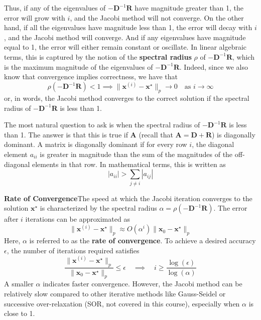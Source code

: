 Thus, if any of the eigenvalues of $-\mathbf{D}^{-1}\mathbf{R}$ have magnitude greater than 1, the error will grow with $i$, and the Jacobi method will not converge. On the other hand, if all the eigenvalues have magnitude less than 1, the error will decay with $i$, and the Jacobi method will converge. And if any eigenvalues have magnitude equal to 1, the error will either remain constant or oscillate. In linear algebraic terms, this is captured by the notion of the \textbf{spectral radius} $\rho$ of $-\mathbf{D}^{-1}\mathbf{R}$, which is the maximum magnitude of the eigenvalues of $-\mathbf{D}^{-1}\mathbf{R}$. Indeed, since we also know that convergence implies correctness, we have that
\begin{equation*}
    \rho(-\mathbf{D}^{-1}\mathbf{R}) < 1 \implies \|\mathbf{x}^{(i)} - \mathbf{x}^\star\|_p \to 0 \quad \text{as } i \to \infty
\end{equation*}
or, in words, the Jacobi method converges to the correct solution if the spectral radius of $-\mathbf{D}^{-1}\mathbf{R}$ is less than 1.

The most natural question to ask is when the spectral radius of $-\mathbf{D}^{-1}\mathbf{R}$ is less than 1. The answer is that this is true if $\mathbf{A}$ (recall that $\mathbf{A} = \mathbf{D} + \mathbf{R}$) is diagonally dominant. A matrix is diagonally dominant if for every row $i$, the diagonal element $a_{ii}$ is greater in magnitude than the sum of the magnitudes of the off-diagonal elements in that row. In mathematical terms, this is written as
\begin{equation*}
    |a_{ii}| > \sum_{j \neq i} |a_{ij}|
\end{equation*}

\textbf{Rate of Convergence}\quad The speed at which the Jacobi iteration converges to the solution $\mathbf{x}^\star$ is characterized by the spectral radius $\alpha = \rho(-\mathbf{D}^{-1}\mathbf{R})$. The error after $i$ iterations can be approximated as
\begin{equation*}
    \|\mathbf{x}^{(i)} - \mathbf{x}^\star\|_p \approx O(\alpha^i) \|\mathbf{x}_0 - \mathbf{x}^\star\|_p
\end{equation*}
Here, $\alpha$ is referred to as the \textbf{rate of convergence}. To achieve a desired accuracy $\epsilon$, the number of iterations required satisfies
\begin{equation*}
    \frac{\|\mathbf{x}^{(i)} - \mathbf{x}^\star\|_p}{\|\mathbf{x}_0 - \mathbf{x}^\star\|_p} \leq \epsilon 
    \quad\implies\quad 
    i \geq \frac{\log(\epsilon)}{\log(\alpha)}
\end{equation*}
A smaller $\alpha$ indicates faster convergence. However, the Jacobi method can be relatively slow compared to other iterative methods like Gauss-Seidel or successive over-relaxation (SOR, not covered in this course), especially when $\alpha$ is close to 1.

